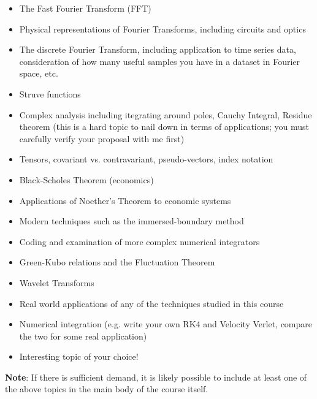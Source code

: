\documentclass[12pt]{article}
\begin{document}
\begin{itemize}
  \item The Fast Fourier Transform (FFT)
  \item Physical representations of Fourier Transforms, including circuits and optics
  \item The discrete Fourier Transform, including application to time series data, consideration of how many useful samples you have in a dataset in Fourier space, etc.
  \item Struve functions
  \item Complex analysis including itegrating around poles, Cauchy
    Integral, Residue theorem ({\textbf this is a hard topic to nail
      down in terms of applications; you must carefully verify your
      proposal with me first})
  \item Tensors, covariant vs. contravariant, pseudo-vectors, index notation
  \item Black-Scholes Theorem (economics)
  \item Applications of Noether's Theorem to economic systems
  \item Modern techniques such as the immersed-boundary method
  \item Coding and examination of more complex numerical integrators
  \item Green-Kubo relations and the Fluctuation Theorem
  \item Wavelet Transforms
  \item Real world applications of any of the techniques studied in this course
  \item Numerical integration (e.g. write your own RK4 and Velocity 
    Verlet, compare the two for some real application) 
  \item Interesting topic of your choice!
\end{itemize}

\textbf{Note}: If there is sufficient demand, it is likely possible to include at least one of the above topics in the main body of the course itself.
\end{document}
